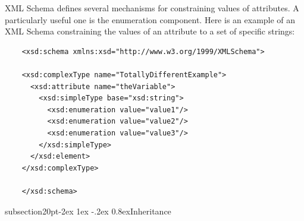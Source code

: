 \documentclass[10pt]{article}
\makeatletter
\renewcommand{\subsection}{\@startsection%
  {subsection}{2}{0pt}{-2ex \@plus 1ex \@minus -.2ex}%
  {0.8ex}{\slshape\large\bfseries}}
\newcommand{\tightspacing}{\renewcommand{\baselinestretch}{0.85}}
\newcommand{\regularspacing}{\renewcommand{\baselinestretch}{1.0}}
\newcommand{\class}[1]{\textsf{#1}}
\newcommand{\attrib}[1]{\textsf{#1}}
\newcommand{\attribtype}[1]{\textsf{#1}}
\makeatother
\begin{document}


XML Schema defines several mechanisms for constraining values of
attributes.  A particularly useful one is the \attrib{enumeration}
component.  Here is an example of an XML Schema constraining the values of
an attribute to a set of specific strings:
\begin{small}
  \tightspacing
\begin{verbatim}
    <xsd:schema xmlns:xsd="http://www.w3.org/1999/XMLSchema">
    
    <xsd:complexType name="TotallyDifferentExample">
      <xsd:attribute name="theVariable">
        <xsd:simpleType base="xsd:string">
          <xsd:enumeration value="value1"/>
          <xsd:enumeration value="value2"/>
          <xsd:enumeration value="value3"/>
        </xsd:simpleType>
      </xsd:element>
    </xsd:complexType>
    
    </xsd:schema>
\end{verbatim}
  \regularspacing
\end{small}


\subsection{Inheritance}
\end{document}
